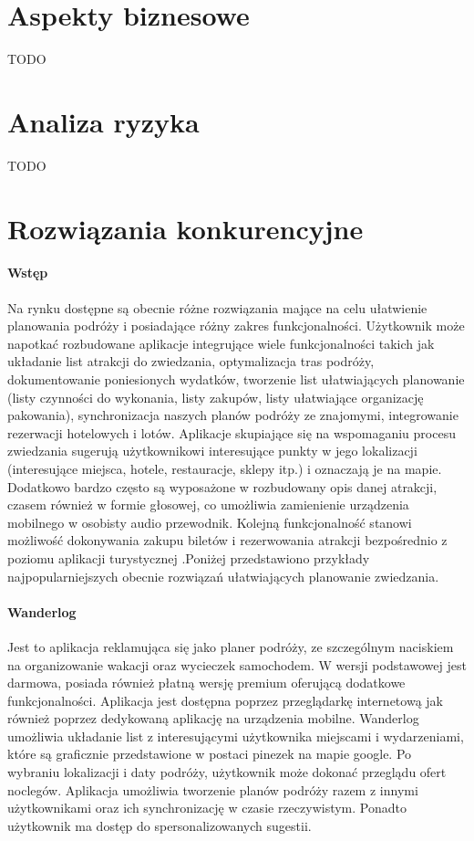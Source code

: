 \section{Aspekty biznesowe}
\label{sec:aspekty-biznesowe}

TODO

\section{Analiza ryzyka}
\label{sec:analiza-ryzyka}

TODO

\section{Rozwiązania konkurencyjne}
\label{sec:rozwiazania-konkurencyjne}

\paragraph{Wstęp}

Na rynku dostępne są obecnie różne rozwiązania mające na celu ułatwienie planowania podróży i posiadające różny zakres funkcjonalności.
Użytkownik może napotkać rozbudowane aplikacje integrujące wiele funkcjonalności takich jak układanie list atrakcji do zwiedzania,
optymalizacja tras podróży, dokumentowanie poniesionych wydatków, tworzenie list ułatwiających planowanie (listy czynności do wykonania,
listy zakupów, listy ułatwiające organizację pakowania), synchronizacja naszych planów podróży ze znajomymi, integrowanie rezerwacji hotelowych i lotów.
Aplikacje skupiające się na wspomaganiu procesu zwiedzania sugerują użytkownikowi interesujące punkty w jego lokalizacji (interesujące miejsca, hotele,
restauracje, sklepy itp.) i oznaczają je na mapie. Dodatkowo bardzo często są wyposażone w rozbudowany opis danej atrakcji, czasem również w formie
głosowej, co umożliwia zamienienie urządzenia mobilnego w osobisty audio przewodnik. Kolejną funkcjonalność stanowi możliwość dokonywania zakupu biletów
i rezerwowania atrakcji bezpośrednio z poziomu aplikacji turystycznej .Poniżej przedstawiono przykłady najpopularniejszych obecnie rozwiązań
ułatwiających planowanie zwiedzania.

\paragraph{Wanderlog}

Jest to aplikacja reklamująca się jako planer podróży, ze szczególnym naciskiem na organizowanie wakacji oraz wycieczek samochodem.
W wersji podstawowej jest darmowa, posiada również płatną wersję premium  oferującą dodatkowe funkcjonalności.
Aplikacja jest dostępna poprzez przeglądarkę internetową jak również poprzez dedykowaną aplikację na urządzenia mobilne.
Wanderlog umożliwia układanie list z interesującymi użytkownika miejscami i wydarzeniami, które są graficznie przedstawione w
postaci pinezek na mapie google. Po wybraniu lokalizacji i daty podróży, użytkownik może dokonać przeglądu ofert noclegów.
Aplikacja umożliwia tworzenie planów podróży razem z innymi użytkownikami oraz ich synchronizację w czasie rzeczywistym.
Ponadto użytkownik ma dostęp do spersonalizowanych sugestii.

